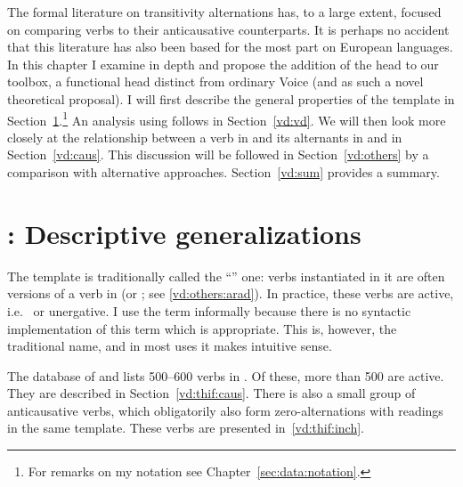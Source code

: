 The formal literature on transitivity alternations has, to a large extent, focused on comparing  verbs to their anticausative counterparts. It is perhaps no accident that this literature has also been based for the most part on European languages. In this chapter I examine {\thif} in depth and propose the addition of the head {\vd} to our toolbox, a functional head distinct from ordinary Voice (and as such a novel theoretical proposal). I will first describe the general properties of the template {\thif} in Section~\ref{vd:thif}.\footnote{For remarks on my notation see Chapter~\ref{sec:data:notation}.} An analysis using {\vd} follows in Section~\ref{vd:vd}. We will then look more closely at the relationship between a verb in {\tkal} and its alternants in {\tnif} and {\thif} in Section~\ref{vd:caus}. This discussion will be followed in Section~\ref{vd:others} by a comparison with alternative approaches. Section~\ref{vd:sum} provides a summary.


\section{\thif: Descriptive generalizations} \label{vd:thif}
The template {\thif} is traditionally called the ``'' one: verbs instantiated in it are often  versions of a verb in {\tkal} (or {\tnif}; see \ref{vd:others:arad}). In practice, these verbs are active, i.e.~ or unergative. I use the term \textsc{} informally because there is no syntactic implementation of this term which is appropriate. This is, however, the traditional name, and in most  uses it makes intuitive sense.

The database of \cite{ehrenfeld12} and \cite{ahdout19phd} lists 500--600 verbs in {\thif}. Of these, more than 500 are active. They are described in Section~\ref{vd:thif:caus}. There is also a small group of anticausative verbs, which obligatorily also form zero-alternations with  readings in the same template. These verbs are presented in~\ref{vd:thif:inch}.


